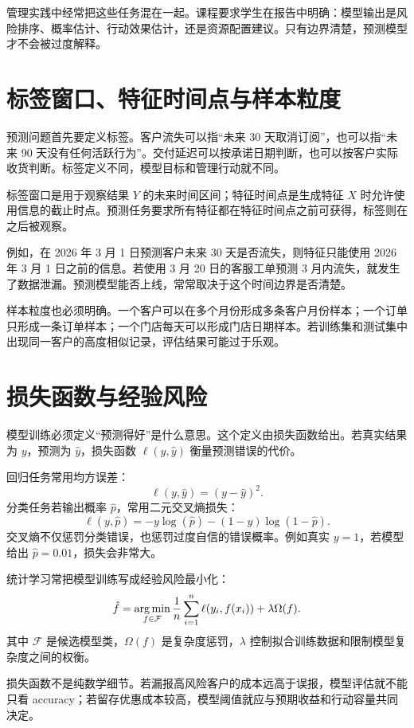 \documentclass[UTF8,fontset=fandol,openany,zihao=-4]{ctexbook}
\begin{document}
管理实践中经常把这些任务混在一起。课程要求学生在报告中明确：模型输出是风险排序、概率估计、行动效果估计，还是资源配置建议。只有边界清楚，预测模型才不会被过度解释。

\section{标签窗口、特征时间点与样本粒度}

预测问题首先要定义标签。客户流失可以指“未来 30 天取消订阅”，也可以指“未来 90 天没有任何活跃行为”。交付延迟可以按承诺日期判断，也可以按客户实际收货判断。标签定义不同，模型目标和管理行动就不同。

\begin{definition}[标签窗口与特征时间点]
标签窗口是用于观察结果 \(Y\) 的未来时间区间；特征时间点是生成特征 \(X\) 时允许使用信息的截止时点。预测任务要求所有特征都在特征时间点之前可获得，标签则在之后被观察。
\end{definition}

例如，在 2026 年 3 月 1 日预测客户未来 30 天是否流失，则特征只能使用 2026 年 3 月 1 日之前的信息。若使用 3 月 20 日的客服工单预测 3 月内流失，就发生了数据泄漏。预测模型能否上线，常常取决于这个时间边界是否清楚。

样本粒度也必须明确。一个客户可以在多个月份形成多条客户月份样本；一个订单只形成一条订单样本；一个门店每天可以形成门店日期样本。若训练集和测试集中出现同一客户的高度相似记录，评估结果可能过于乐观。

\section{损失函数与经验风险}

模型训练必须定义“预测得好”是什么意思。这个定义由损失函数给出。若真实结果为 \(y\)，预测为 \(\hat y\)，损失函数 \(\ell(y,\hat y)\) 衡量预测错误的代价。

回归任务常用均方误差：
\[
  \ell(y,\hat y)=(y-\hat y)^2.
\]
分类任务若输出概率 \(\hat p\)，常用二元交叉熵损失：
\[
  \ell(y,\hat p)
  =
  -y\log(\hat p)-(1-y)\log(1-\hat p).
\]
交叉熵不仅惩罚分类错误，也惩罚过度自信的错误概率。例如真实 \(y=1\)，若模型给出 \(\hat p=0.01\)，损失会非常大。

统计学习常把模型训练写成经验风险最小化：
\[
  \hat f
  =
  \operatorname*{arg\,min}_{f\in\mathcal F}
  \frac{1}{n}\sum_{i=1}^{n}\ell(y_i,f(x_i))
  +
  \lambda\Omega(f).
\]
其中 \(\mathcal F\) 是候选模型类，\(\Omega(f)\) 是复杂度惩罚，\(\lambda\) 控制拟合训练数据和限制模型复杂度之间的权衡。

\begin{modernbox}[管理解释]
损失函数不是纯数学细节。若漏报高风险客户的成本远高于误报，模型评估就不能只看 accuracy；若留存优惠成本较高，模型阈值就应与预期收益和行动容量共同决定。
\end{modernbox}
\end{document}
